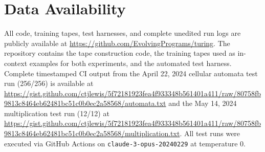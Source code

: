 \documentclass[twocolumn,switch,10pt]{article}
\begin{document}
\section*{Data Availability}

All code, training tapes, test harnesses, and complete unedited run logs are publicly available at \url{https://github.com/EvolvingPrograms/turing}. The repository contains the tape construction code, the training tapes used as in-context examples for both experiments, and the automated test harness. Complete timestamped CI output from the April 22, 2024 cellular automata test run (256/256) is available at \url{https://gist.github.com/ctjlewis/5f72181923fea4f933348b561401a411/raw/80758fb9813c8464eb62481bc51c0b0ec2a58568/automata.txt} and the May 14, 2024 multiplication test run (12/12) at \url{https://gist.github.com/ctjlewis/5f72181923fea4f933348b561401a411/raw/80758fb9813c8464eb62481bc51c0b0ec2a58568/multiplication.txt}. All test runs were executed via GitHub Actions on \texttt{claude-3-opus-20240229} at temperature 0.
\end{document}
